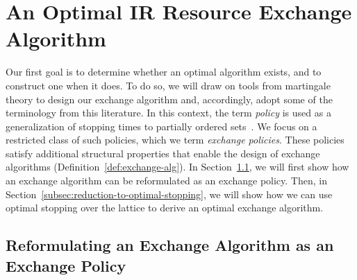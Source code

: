 \section{An Optimal IR Resource Exchange Algorithm}
\label{sec:opt-non-ic-alg}

Our first goal is to determine whether an optimal algorithm exists, and to construct one when it does.
To do so,
we will draw on tools from martingale theory to design our exchange algorithm and, accordingly, adopt some of the 
terminology from this literature. In this context, the term \emph{policy} is used as a generalization of stopping 
times to partially ordered sets~\citep{mandelbaum1981optimal,williams1991probability}. We focus on a restricted class 
of such policies, which we term \emph{exchange policies}. These policies satisfy additional structural properties that 
enable the design of exchange algorithms (Definition~\ref{def:exchange-alg}). In Section~\ref{sec:exchangealgotopolicy}, 
we will first show how an exchange algorithm can be reformulated as an exchange policy.
Then, in Section~\ref{subsec:reduction-to-optimal-stopping}, we will show how we can use optimal stopping over the lattice to derive an optimal exchange algorithm.

\subsection{Reformulating an Exchange Algorithm as an Exchange Policy}
\label{sec:exchangealgotopolicy}






